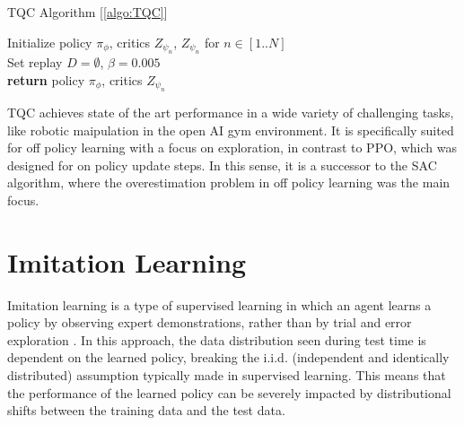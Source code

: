\begin{algorithm}
    \caption{TQC Algorithm [\ref{algo:TQC}]}
    \label{algo:TQC}
    \begin{algorithmic}
        \State Initialize policy $\pi_{\phi}$, critics $Z_{\psi_n}$, $Z_{\psi_n}$ for $n \in [1..N]$\\
        \State Set replay $D = \emptyset$, $\beta = 0.005$\\
        \State \textbf{return} policy $\pi_{\phi}$, critics $Z_{\psi_n}$
    \end{algorithmic}
\end{algorithm}
TQC achieves state of the art performance in a wide variety of challenging tasks, like robotic maipulation in the open AI gym environment. It is specifically suited 
for off policy learning with a focus on exploration, in contrast to PPO, which was designed for on policy update steps. In this sense, it is a successor to the 
SAC algorithm, where the overestimation problem in off policy learning was the main focus.

\section{Imitation Learning}
Imitation learning is a type of supervised learning in which an agent learns a policy by observing expert demonstrations, 
rather than by trial and error exploration \cite{IL}. In this approach, the data distribution seen during test time is dependent on the learned policy, 
breaking the i.i.d. (independent and identically distributed) assumption typically made in supervised learning. This means that the performance of the 
learned policy can be severely impacted by distributional shifts between the training data and the test data. \\ \\

